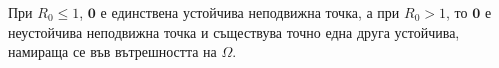 
При $R_0 \leq 1$, $\mathbf{0}$ е единствена устойчива неподвижна точка, а при $R_0 > 1$, то $\mathbf{0}$ е неустойчива неподвижна точка и съществува точно една друга устойчива, намираща се във вътрешността на $\Omega$.


